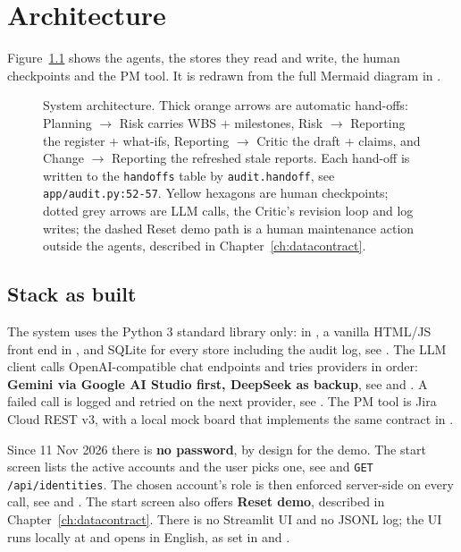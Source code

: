 \chapter{Architecture}
\label{ch:architecture}

Figure~\ref{fig:architecture} shows the agents, the stores they read and write, the human checkpoints and the PM tool. It is redrawn from the full Mermaid diagram in .

\begin{figure}[htbp]
  \centering
  \resizebox{\textwidth}{!}{}
  \caption[System architecture: agents, hand-offs, human checkpoints and the PM tool]{System architecture. Thick orange arrows are automatic hand-offs: Planning $\rightarrow$ Risk carries WBS + milestones, Risk $\rightarrow$ Reporting the register + what-ifs, Reporting $\rightarrow$ Critic the draft + claims, and Change $\rightarrow$ Reporting the refreshed stale reports. Each hand-off is written to the \texttt{handoffs} table by \texttt{audit.handoff}, see \texttt{app/audit.py:52-57}. Yellow hexagons are human checkpoints; dotted grey arrows are LLM calls, the Critic's revision loop and log writes; the dashed Reset demo path is a human maintenance action outside the agents, described in Chapter~\ref{ch:datacontract}.}
  \label{fig:architecture}
\end{figure}

\section{Stack as built}

The system uses the Python 3 standard library only:  in , a vanilla HTML/JS front end in , and SQLite for every store including the audit log, see . The LLM client calls OpenAI-compatible chat endpoints and tries providers in order: \textbf{Gemini via Google AI Studio first, DeepSeek as backup}, see  and . A failed call is logged and retried on the next provider, see . The PM tool is Jira Cloud REST v3, with a local mock board that implements the same contract in .

Since 11 Nov 2026 there is \textbf{no password}, by design for the demo. The start screen lists the active accounts and the user picks one, see  and \texttt{GET /api/identities}. The chosen account's role is then enforced server-side on every call, see  and . The start screen also offers \textbf{Reset demo}, described in Chapter~\ref{ch:datacontract}. There is no Streamlit UI and no JSONL log; the UI runs locally at  and opens in English, as set in  and .

